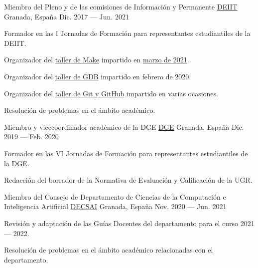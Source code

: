 
\begin{cventries}

\cventry%
	{Miembro del Pleno y de las comisiones de Información y Permanente} %
	{\href{https://deiit.ugr.es/}{DEIIT}} %
	{Granada, España} %
	{Dic. 2017 --- Jun. 2021} %
	{%
		\begin{cvitems} %
			\item
				Formador en las I Jornadas de Formación para representantes estudiantiles de la DEIIT.
			\item
				Organizador del \href{https://github.com/DEIIT/taller-make/}{taller de Make} impartido en \href{https://deiit.ugr.es/make-marzo-2021/}{marzo de 2021}.
			\item
				Organizador del \href{https://github.com/DEIIT/taller-gdb/}{taller de GDB} impartido en febrero de 2020.
			\item
				Organizador del \href{https://github.com/DEIIT/taller-git-y-github/}{taller de Git y GitHub} impartido en varias ocasiones.
			\item
				Resolución de problemas en el ámbito académico.
		\end{cvitems}
	}



\cventry%
	{Miembro y vicecoordinador académico de la DGE} %
	{\href{https://dge.ugr.es/}{DGE}} %
	{Granada, España} %
	{Dic. 2019 --- Feb. 2020} %
	{%
		\begin{cvitems} %
			\item
				Formador en las VI Jornadas de Formación para representantes estudiantiles de la DGE.
			\item
				Redacción del borrador de la Normativa de Evaluación y Calificación de la UGR.
		\end{cvitems}
	}


\cventry%
	{Miembro del Consejo de Departamento de Ciencias de la Computación e Inteligencia Artificial} %
	{\href{https://decsai.ugr.es/}{DECSAI}} %
	{Granada, España} %
	{Nov. 2020 --- Jun. 2021} %
	{%
		\begin{cvitems} %
			\item
				Revisión y adaptación de las Guías Docentes del departamento para el curso 2021 --- 2022.
			\item
				Resolución de problemas en el ámbito académico relacionadas con el departamento.
		\end{cvitems}
	}


\end{cventries}
